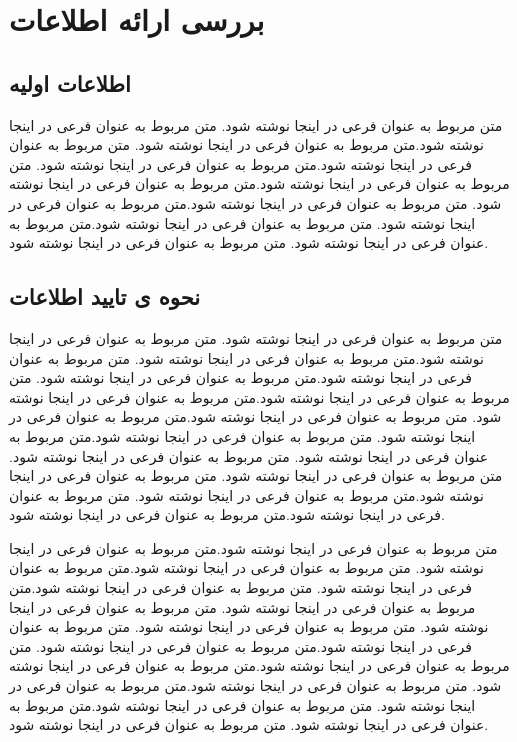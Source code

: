 \chapter{بررسی ارائه اطلاعات}

\section{ اطلاعات اولیه}
 متن مربوط به عنوان فرعی در اینجا نوشته شود. متن مربوط به عنوان فرعی در اینجا نوشته شود.متن مربوط به عنوان فرعی در اینجا نوشته شود. متن مربوط به عنوان فرعی در اینجا نوشته شود.متن مربوط به عنوان فرعی در اینجا نوشته شود. متن مربوط به عنوان فرعی در اینجا نوشته شود.متن مربوط به عنوان فرعی در اینجا نوشته شود. متن مربوط به عنوان فرعی در اینجا نوشته شود.متن مربوط به عنوان فرعی در اینجا نوشته شود. متن مربوط به عنوان فرعی در اینجا نوشته شود.متن مربوط به عنوان فرعی در اینجا نوشته شود. متن مربوط به عنوان فرعی در اینجا نوشته شود.

 \section{نحوه ی تایید اطلاعات}
  متن مربوط به عنوان فرعی در اینجا نوشته شود. متن مربوط به عنوان فرعی در اینجا نوشته شود.متن مربوط به عنوان فرعی در اینجا نوشته شود. متن مربوط به عنوان فرعی در اینجا نوشته شود.متن مربوط به عنوان فرعی در اینجا نوشته شود. متن مربوط به عنوان فرعی در اینجا نوشته شود.متن مربوط به عنوان فرعی در اینجا نوشته شود. متن مربوط به عنوان فرعی در اینجا نوشته شود.متن مربوط به عنوان فرعی در اینجا نوشته شود. متن مربوط به عنوان فرعی در اینجا نوشته شود.متن مربوط به عنوان فرعی در اینجا نوشته شود. متن مربوط به عنوان فرعی در اینجا نوشته شود. متن مربوط به عنوان فرعی در اینجا نوشته شود. متن مربوط به عنوان فرعی در اینجا نوشته شود.متن مربوط به عنوان فرعی در اینجا نوشته شود. متن مربوط به عنوان فرعی در اینجا نوشته شود.متن مربوط به عنوان فرعی در اینجا نوشته شود. 
  
  متن مربوط به عنوان فرعی در اینجا نوشته شود.متن مربوط به عنوان فرعی در اینجا نوشته شود. متن مربوط به عنوان فرعی در اینجا نوشته شود.متن مربوط به عنوان فرعی در اینجا نوشته شود. متن مربوط به عنوان فرعی در اینجا نوشته شود.متن مربوط به عنوان فرعی در اینجا نوشته شود. متن مربوط به عنوان فرعی در اینجا نوشته شود. متن مربوط به عنوان فرعی در اینجا نوشته شود. متن مربوط به عنوان فرعی در اینجا نوشته شود.متن مربوط به عنوان فرعی در اینجا نوشته شود. متن مربوط به عنوان فرعی در اینجا نوشته شود.متن مربوط به عنوان فرعی در اینجا نوشته شود. متن مربوط به عنوان فرعی در اینجا نوشته شود.متن مربوط به عنوان فرعی در اینجا نوشته شود. متن مربوط به عنوان فرعی در اینجا نوشته شود.متن مربوط به عنوان فرعی در اینجا نوشته شود. متن مربوط به عنوان فرعی در اینجا نوشته شود.
  
